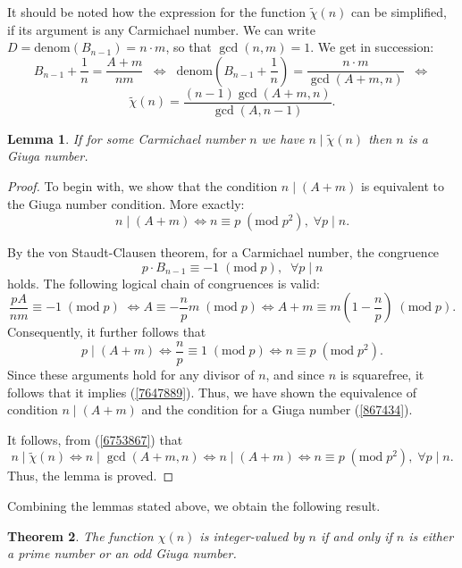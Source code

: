 \documentclass[reqno,a4paper,11pt]{amsart}
\numberwithin{equation}{section}
\newtheorem{theorem}{Theorem}[section]
\newtheorem{lemma}[theorem]{Lemma}
\theoremstyle{definition}
\begin{document}
It should be noted how the expression for the function $\tilde{\chi}(n)$  can be simplified, if its argument is any Carmichael number.   We can write $D=\mathrm{denom}\left(B_{n-1}\right)=n\cdot m$, so that $\gcd\left(n, m\right)=1$. We get in succession:
\[
B_{n-1}+\frac{1}{n}=\frac{A+m}{nm}\;\; \Leftrightarrow \;\;  \mathrm{denom}\left(B_{n-1}+\frac{1}{n}\right)=\frac{n\cdot m}{\gcd(A+m, n)}\;\; \Leftrightarrow 
\]
\begin{equation}
\tilde{\chi}(n)=\frac{\left(n-1\right)\gcd(A+m, n)}{\gcd(A, n-1)}.
\label{6753867}
\end{equation}
\begin{lemma}
If for some Carmichael number $n$ we have  $n \mid \tilde{\chi}(n)$ then $n$ is a Giuga number.  
\end{lemma}
\begin{proof}
To begin with, we show that the condition $n\mid \left(A+m\right)$ is equivalent to the Giuga number condition. More exactly: 
\begin{equation}
n\mid \left(A+m\right) \Leftrightarrow n \equiv p\; \left(\mathrm{mod}\; p^2\right),\; \forall p\mid n.
\label{7647889}
\end{equation}

By the von Staudt-Clausen theorem, for a Carmichael number, the congruence 
\[
p\cdot B_{n-1}\equiv -1\; (\mathrm{mod}\; p),\;\; \forall p\mid n
\] 
holds.   The following logical chain of congruences is valid:
\[
\frac{p A}{nm}\equiv -1\; (\mathrm{mod}\; p)\; \Leftrightarrow A \equiv -\frac{n}{p}m\; (\mathrm{mod}\; p) \Leftrightarrow 
A+m \equiv m\left(1-\frac{n}{p}\right)\; (\mathrm{mod}\; p).
\]
Consequently, it further follows that 
\[
p\mid \left(A+m\right) \Leftrightarrow \frac{n}{p} \equiv 1 \; (\mathrm{mod}\; p) \Leftrightarrow n \equiv p \; (\mathrm{mod}\; p^2).
\]
Since these arguments hold for any divisor of $n$, and since $n$ is squarefree, it follows that it implies (\ref{7647889}). Thus, we have shown the equivalence of condition $n\mid \left(A+m\right)$ and the condition for a Giuga number (\ref{867434}). 

It follows, from (\ref{6753867}) that 
\[
n\mid \tilde{\chi}(n) \Leftrightarrow n\mid \gcd (A+m, n) \Leftrightarrow n\mid \left(A+m\right) \Leftrightarrow n \equiv p\; \left(\mathrm{mod}\; p^2\right),\; \forall p\mid n.
\]
Thus, the lemma is proved.
\end{proof}

Combining the lemmas stated above, we obtain the following result.
\begin{theorem}
The function $\chi(n)$ is integer-valued by $n$ if and only if $n$ is either a prime number or an odd Giuga number.
\end{theorem}
\end{document}
